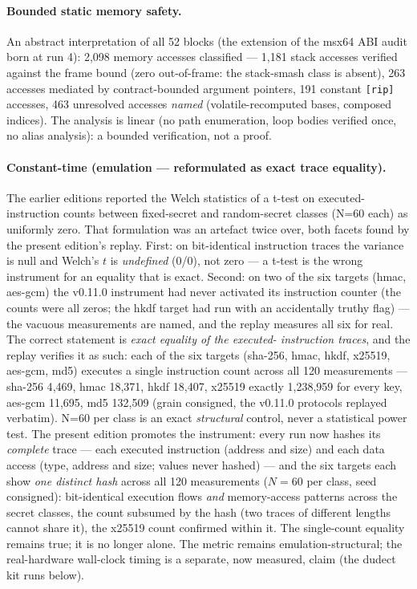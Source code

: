 \documentclass[10pt,a4paper]{article}
\newcommand{\code}[1]{\texttt{\small #1}}
\begin{document}
\paragraph{Bounded static memory safety.} An abstract interpretation of
all 52 blocks (the extension of the msx64 ABI audit born at run 4):
2{,}098 memory accesses classified --- 1{,}181 stack accesses verified
against the frame bound (zero out-of-frame: the stack-smash class is
absent), 263 accesses mediated by contract-bounded argument pointers, 191
constant \code{[rip]} accesses, 463 unresolved accesses \emph{named}
(volatile-recomputed bases, composed indices). The analysis is linear
(no path enumeration, loop bodies verified once, no alias analysis): a
bounded verification, not a proof.

\paragraph{Constant-time (emulation --- reformulated as exact trace equality).}
The earlier editions reported the Welch statistics of a t-test on
executed-instruction counts between fixed-secret and random-secret
classes (N=60 each) as uniformly zero. That formulation was an artefact
twice over, both
facets found by the present edition's replay. First: on bit-identical
instruction traces the variance is null and Welch's $t$ is \emph{undefined}
(0/0), not zero --- a t-test is the wrong instrument for an equality that
is exact. Second: on two of the six targets (hmac, aes-gcm) the v0.11.0
instrument had never activated its instruction counter (the counts were
all zeros; the hkdf target had run with an accidentally truthy flag) ---
the vacuous measurements are named, and the replay measures all six for
real. The correct statement is \emph{exact equality of the executed-
instruction traces}, and the replay verifies it as such: each of the six
targets (sha-256, hmac, hkdf, x25519, aes-gcm, md5) executes a single
instruction count across all 120 measurements --- sha-256 4{,}469, hmac
18{,}371, hkdf 18{,}407, x25519 exactly 1{,}238{,}959 for every key,
aes-gcm 11{,}695, md5 132{,}509 (grain consigned, the v0.11.0 protocols
replayed verbatim). N=60 per class is an exact \emph{structural}
control, never a statistical power test. The present edition promotes
the instrument: every run now hashes its \emph{complete} trace ---
each executed instruction (address and size) and each data access
(type, address and size; values never hashed) --- and the six targets
each show \emph{one distinct hash} across all 120 measurements
($N{=}60$ per class, seed consigned): bit-identical execution flows
\emph{and} memory-access patterns across the secret classes, the count
subsumed by the hash (two traces of different lengths cannot share
it), the x25519 count confirmed within it. The single-count equality
remains true; it is no longer alone. The metric remains
emulation-structural; the real-hardware wall-clock timing is a separate,
now measured, claim (the dudect kit runs below).
\end{document}
